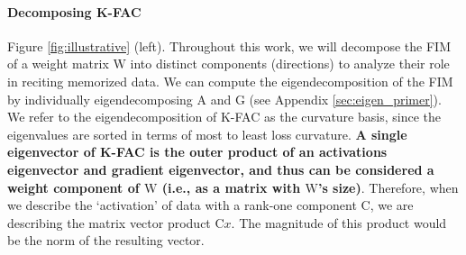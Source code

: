 \documentclass{article} %
\newcommand{\matr}[1]{\ensuremath{\bm{\mathrm{#1}}}}
\begin{document}
\paragraph{Decomposing K-FAC}
\label{sec:decomposing_kfac}
Figure \ref{fig:illustrative} (left). Throughout this work, we will decompose the FIM of a weight matrix \matr{W} into distinct components (directions) to analyze their role in reciting memorized data. We can compute the eigendecomposition of the FIM by individually eigendecomposing $\matr{A}$ and $\matr{G}$ (see Appendix \ref{sec:eigen_primer}). We refer to the eigendecomposition of K-FAC as the curvature basis, since the eigenvalues are sorted in terms of most to least loss curvature. \textbf{A single eigenvector of K-FAC is the outer product of an activations eigenvector and gradient eigenvector, and thus can be considered a weight component of $\matr{W}$ (i.e., as a matrix with \matr{W}'s size)}. Therefore, when we describe the `activation' of data with a rank-one component \matr{C}, we are describing the matrix vector product $\matr{C}x$. The magnitude of this product would be the norm of the resulting vector.


\end{document}
